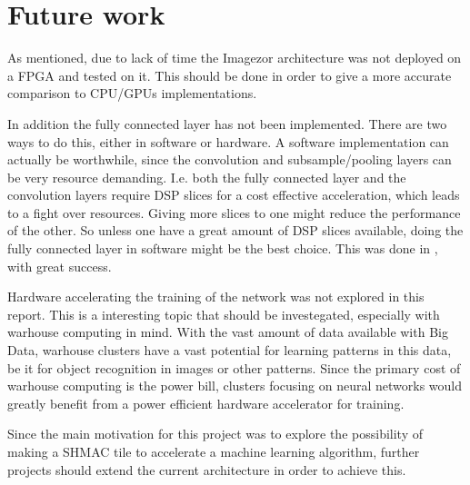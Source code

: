 \chapter{Future work}

As mentioned, due to lack of time the Imagezor architecture was not deployed on a FPGA and tested on it. This should be done in order to give a more accurate comparison to CPU/GPUs implementations.

In addition the fully connected layer has not been implemented. There are two ways to do this, either in software or hardware. A software implementation can actually be worthwhile, since the convolution and subsample/pooling layers can be very resource demanding.  I.e. both the fully connected layer and the convolution layers require DSP slices for a cost effective acceleration, which leads to a fight over resources. Giving more slices to one might reduce the performance of the other. So unless one have a great amount of DSP slices available, doing the fully connected layer in software might be the best choice. This was done in \cite{Paper}, with great success.

Hardware accelerating the training of the network was not explored in this report. This is a interesting topic that should be investegated, especially with warhouse computing in mind. With the vast amount of data available with Big Data, warhouse clusters have a vast potential for learning patterns in this data, be it for object recognition in images or other patterns. Since the primary cost of warhouse computing is the power bill, clusters focusing on neural networks would greatly benefit from a power efficient hardware accelerator for training. 

Since the main motivation for this project was to explore the possibility of making a SHMAC tile to accelerate a machine learning algorithm, further projects should extend the current architecture in order to achieve this.